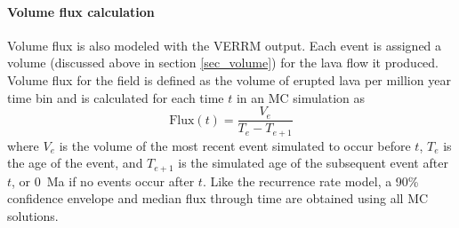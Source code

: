 \paragraph{Volume flux calculation} Volume flux is also modeled with the VERRM output. Each event is assigned a volume (discussed above in section \ref{sec_volume}) for the lava flow it produced. Volume flux for the field is defined as the volume of erupted lava per million year time bin and is calculated for each time $t$ in an MC simulation as
\begin{equation}
\text{Flux}(t) = \frac{V_e}{T_e-T_{e+1}}
\label{eq_VolFlux}
\end{equation}
where $V_e$ is the volume of the most recent event simulated to occur before $t$, $T_e$ is the age of the event, and $T_{e+1}$ is the simulated age of the subsequent event after $t$, or 0~Ma if no events occur after $t$. Like the recurrence rate model, a 90\% confidence envelope and median flux through time are obtained using all MC solutions.



